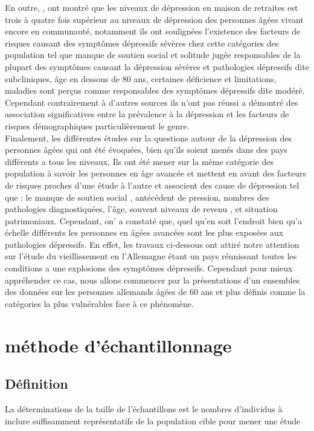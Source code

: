 \documentclass[a4paper]{article}
\begin{document}
	En outre, \citep{Jongenelis2004}, ont montré que les niveaux de dépression en maison de retraites est trois à quatre fois supérieur au niveaux de dépression des personnes âgées vivant encore en communauté, notamment ils ont soulignées l'existence des facteurs de risques causant des symptômes dépressifs sévères chez cette catégories des population tel que manque de soutien social et solitude jugée responsables de la plupart des symptômes causant la dépression sévères et pathologies dépressifs dite subcliniques,  âge en dessous de 80 ans, certaines déficience et limitations, maladies sont perçus comme responsables des symptômes dépressifs dite modéré.\\ Cependant contrairement à d'autres sources ils n’ont pas réussi a démontré des association significatives entre la prévalence à la dépression et les facteurs de risques démographiques particulièrement le genre.\\
	Finalement, les différentes études sur la questions autour de la dépression des personnes âgées qui ont  été évoquées, bien qu’ils soient menés dans des pays différents a tous les niveaux, Ils ont été mener sur la même catégorie des population à savoir les personnes en âge avancée et mettent en avant des facteurs de risques proches d’une étude à l’autre et associent des cause de dépression tel que : le manque de soutien social , antécédent de pression, nombres des pathologies diagnostiquées, l’âge, souvent niveaux de revenu , et situation patrimoniaux. Cependant, on’ a constaté que, quel qu’en soit l’endroit bien qu’a échelle différents les personnes en âgées avancées sont les plus exposées aux pathologies dépressifs. En effet, les travaux ci-dessous ont attiré notre attention sur l’étude du vieillissement en  l’Allemagne étant un pays réunissant toutes les conditions a une explosions des symptômes dépressifs. Cependant pour mieux appréhender ce cas, nous allons commencer par la présentations d’un ensembles des données sur les personnes allemands âgées de 60 ans et plus définis comme la catégories la plus vulnérables face à ce phénomène. 
	
	\section{méthode d'échantillonnage}
	
	\subsection{Définition}
	La déterminations de la taille de l’échantillons est le nombres d’individus  à inclure suffisamment représentatifs de la population cible pour mener une étude
\end{document}
